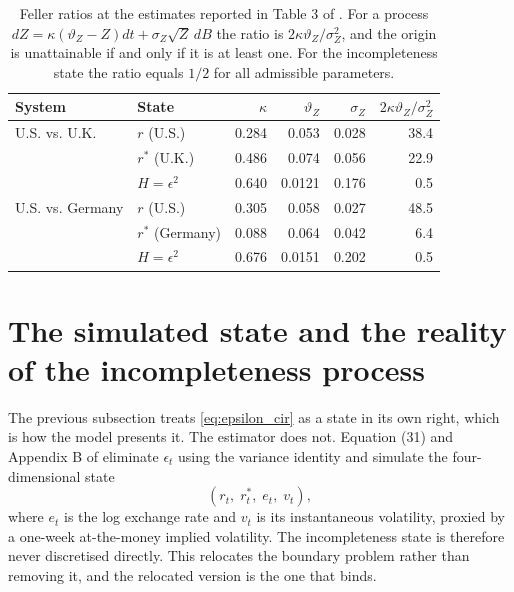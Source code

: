 \documentclass[11pt]{article}
\theoremstyle{definition}
\begin{document}
\begin{table}[htbp]
\centering
\caption{Feller ratios at the estimates reported in Table 3 of \citet{BrandtSantaClara2002}. For a process $dZ=\kappa(\vartheta_Z-Z)dt+\sigma_Z\sqrt Z\,dB$ the ratio is $2\kappa\vartheta_Z/\sigma_Z^2$, and the origin is unattainable if and only if it is at least one. For the incompleteness state the ratio equals $1/2$ for all admissible parameters.}
\label{tab:feller}
\begin{tabular}{llrrrr}
\toprule
System & State & $\kappa$ & $\vartheta_Z$ & $\sigma_Z$ & $2\kappa\vartheta_Z/\sigma_Z^2$ \\
\midrule
U.S. vs. U.K. & $r$ (U.S.) & 0.284 & 0.053 & 0.028 & 38.4 \\
              & $r^*$ (U.K.) & 0.486 & 0.074 & 0.056 & 22.9 \\
              & $H=\epsilon^2$ & 0.640 & 0.0121 & 0.176 & 0.5 \\
U.S. vs. Germany & $r$ (U.S.) & 0.305 & 0.058 & 0.027 & 48.5 \\
              & $r^*$ (Germany) & 0.088 & 0.064 & 0.042 & 6.4 \\
              & $H=\epsilon^2$ & 0.676 & 0.0151 & 0.202 & 0.5 \\
\bottomrule
\end{tabular}
\end{table}

\FloatBarrier
\section{The simulated state and the reality of the incompleteness process}\label{app:reality}

The previous subsection treats \eqref{eq:epsilon_cir} as a state in its own right, which is how the model presents it. The estimator does not. Equation (31) and Appendix B of \citet{BrandtSantaClara2002} eliminate $\epsilon_t$ using the variance identity and simulate the four-dimensional state
\begin{equation}\label{eq:simulated_state}
(r_t,\;r_t^*,\;e_t,\;v_t),
\end{equation}
where $e_t$ is the log exchange rate and $v_t$ is its instantaneous volatility, proxied by a one-week at-the-money implied volatility. The incompleteness state is therefore never discretised directly. This relocates the boundary problem rather than removing it, and the relocated version is the one that binds.
\end{document}
